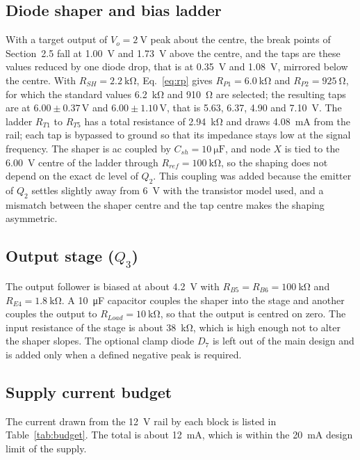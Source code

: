 \documentclass[12pt,a4paper]{article}
\begin{document}
	\subsection{Diode shaper and bias ladder}
	With a target output of $V_o=\SI{2}{\volt}$ peak about the centre, the break points of Section~2.5 fall at \SI{1.00}{\volt} and \SI{1.73}{\volt} above the centre, and the taps are these values reduced by one diode drop, that is at \SI{0.35}{\volt} and \SI{1.08}{\volt}, mirrored below the centre. With $R_{SH}=\SI{2.2}{\kilo\ohm}$, Eq.~\eqref{eq:rp} gives $R_{P1}=\SI{6.0}{\kilo\ohm}$ and $R_{P2}=\SI{925}{\ohm}$, for which the standard values \SI{6.2}{\kilo\ohm} and \SI{910}{\ohm} are selected; the resulting taps are at $6.00\pm0.37\,\mathrm{V}$ and $6.00\pm1.10\,\mathrm{V}$, that is 5.63, 6.37, 4.90 and \SI{7.10}{\volt}. The ladder $R_{T1}$ to $R_{T5}$ has a total resistance of \SI{2.94}{\kilo\ohm} and draws \SI{4.08}{\milli\ampere} from the rail; each tap is bypassed to ground so that its impedance stays low at the signal frequency. The shaper is ac coupled by $C_{sh}=\SI{10}{\micro\farad}$, and node $X$ is tied to the \SI{6.00}{\volt} centre of the ladder through $R_{ref}=\SI{100}{\kilo\ohm}$, so the shaping does not depend on the exact dc level of $Q_2$. This coupling was added because the emitter of $Q_2$ settles slightly away from \SI{6}{\volt} with the transistor model used, and a mismatch between the shaper centre and the tap centre makes the shaping asymmetric.

	\subsection{Output stage ($Q_3$)}
	The output follower is biased at about \SI{4.2}{\volt} with $R_{B5}=R_{B6}=\SI{100}{\kilo\ohm}$ and $R_{E4}=\SI{1.8}{\kilo\ohm}$. A \SI{10}{\micro\farad} capacitor couples the shaper into the stage and another couples the output to $R_{Load}=\SI{10}{\kilo\ohm}$, so that the output is centred on zero. The input resistance of the stage is about \SI{38}{\kilo\ohm}, which is high enough not to alter the shaper slopes. The optional clamp diode $D_7$ is left out of the main design and is added only when a defined negative peak is required.

	\subsection{Supply current budget}
	The current drawn from the \SI{12}{\volt} rail by each block is listed in Table~\ref{tab:budget}. The total is about \SI{12}{\milli\ampere}, which is within the \SI{20}{\milli\ampere} design limit of the supply.
\end{document}
